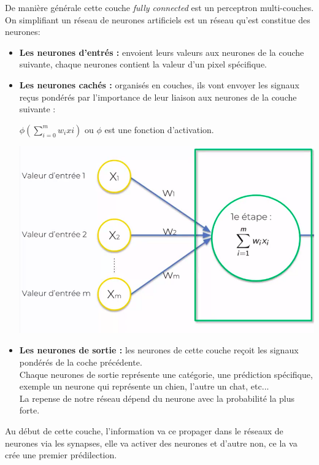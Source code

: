 De manière générale cette couche \textit{fully connected} est un perceptron multi-couches.\\
On simplifiant un réseau de neurones artificiels est un réseau qu'est constitue  des neurones:
\begin{itemize}
\item \textbf{Les neurones d'entrés :} envoient leurs valeurs aux neurones de la couche suivante, chaque neurones contient la valeur d'un pixel spécifique.
\item \textbf{Les neurones cachés :} organisés en couches, ils vont envoyer les signaux reçus pondérés par l'importance de leur liaison aux neurones de la couche suivante :
\begin{center}
	$\phi \left( \sum_{i=0}^{m} w_{i}x{i}\right)$ ou $\phi$ est une fonction d'activation.
\end{center} 
\begin{center}
	\includegraphics[scale=0.2]{img23.png}
\end{center}
\item \textbf{Les neurones de sortie :} les neurones de cette couche reçoit les signaux pondérés de la coche précédente.\\
Chaque neurones de sortie représente une catégorie, une prédiction spécifique, exemple un neurone qui représente un chien, l'autre un chat, etc...\\
La repense de notre réseau dépend du neurone avec la probabilité la plus forte.
\end{itemize}
Au début de cette couche, l'information va ce propager dans le réseaux de neurones via les synapses, elle va activer des neurones et d'autre non, ce la va crée une premier prédilection.\\
